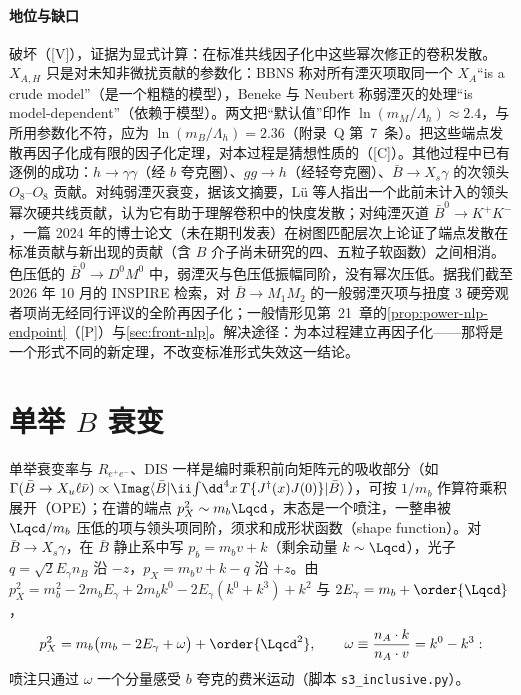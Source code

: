 \paragraph{地位与缺口}
破坏（[V]），证据为显式计算：在标准共线因子化中这些幂次修正的卷积发散。$X_{A,H}$ 只是对未知非微扰贡献的参数化：BBNS 称对所有湮灭项取同一个 $X_A$“is a crude model”（是一个粗糙的模型）\cite[第~3.5~节]{BenekeEtAl2001}，Beneke 与 Neubert 称弱湮灭的处理“is model-dependent”（依赖于模型）\cite[第~2.4~节]{BenekeNeubert2003}。两文把“默认值”印作 $\ln(m_M/\Lambda_h)\approx2.4$，与所用参数化不符，应为 $\ln(m_B/\Lambda_h)=2.36$（附录~Q 第~7~条）。把这些端点发散再因子化成有限的因子化定理，对本过程是猜想性质的（[C]）。其他过程中已有逐例的成功：$h\to\gamma\gamma$（经 $b$ 夸克圈）\cite{Liu:2019oav,Liu:2020wbn}、$gg\to h$（经轻夸克圈）\cite{Liu:2022ajh}、$\bar B\to X_s\gamma$ 的次领头 $O_8$--$O_8$ 贡献\cite{Hurth:2023paz}。对纯弱湮灭衰变，据该文摘要，Lü 等人指出一个此前未计入的领头幂次硬共线贡献，认为它有助于理解卷积中的快度发散\cite{Lu:2022kos}；对纯湮灭道 $\bar B^0\to K^+K^-$，一篇 2024 年的博士论文（未在期刊发表）在树图匹配层次上论证了端点发散在标准贡献与新出现的贡献（含 $B$ 介子尚未研究的四、五粒子软函数）之间相消\cite{Stillger:2024sgy}。色压低的 $\bar B^0\to D^0M^0$ 中，弱湮灭与色压低振幅同阶，没有幂次压低\cite{Mantry:2003uz}。据我们截至 2026 年 10 月的 INSPIRE 检索，对 $\bar B\to M_1M_2$ 的一般弱湮灭项与扭度 3 硬旁观者项尚无经同行评议的全阶再因子化；一般情形见第~21~章的\cref{prop:power-nlp-endpoint}（[P]）与\cref{sec:front-nlp}。解决途径：为本过程建立再因子化——那将是一个形式不同的新定理，不改变标准形式失效这一结论。

\section{单举 $B$ 衰变}\label{sec:heavy-inclusive}

单举衰变率与 $R_{e^+e^-}$、DIS 一样是编时乘积前向矩阵元的吸收部分（如 $\Gamma(\bar B\to X_u\ell\bar\nu)\propto\Imag\langle\bar B|\ii\!\int\!\dd^4x\,T\{J^\dagger(x)J(0)\}|\bar B\rangle$），可按 $1/m_b$ 作算符乘积展开（OPE）；在谱的端点 $p_X^2\sim m_b\Lqcd$，末态是一个喷注，一整串被 $\Lqcd/m_b$ 压低的项与领头项同阶，须求和成形状函数（shape function）。对 $\bar B\to X_s\gamma$，在 $\bar B$ 静止系中写 $p_b=m_bv+k$（剩余动量 $k\sim\Lqcd$），光子 $q=\sqrt2E_\gamma n_B$ 沿 $-z$，$p_X=m_bv+k-q$ 沿 $+z$。由 $p_X^2=m_b^2-2m_bE_\gamma+2m_bk^0-2E_\gamma(k^0+k^3)+k^2$ 与 $2E_\gamma=m_b+\order{\Lqcd}$，
\begin{equation}\label{eq:heavy-pX2}
p_X^2=m_b\big(m_b-2E_\gamma+\omega\big)+\order{\Lqcd^2},\qquad \omega\equiv\frac{n_A\cdot k}{n_A\cdot v}=k^0-k^3 :
\end{equation}
喷注只通过 $\omega$ 一个分量感受 $b$ 夸克的费米运动（脚本 \texttt{s3\_\allowbreak inclusive.py}）。

